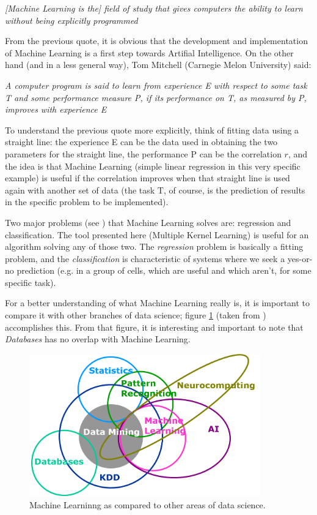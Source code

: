 \documentclass[paper=a4, fontsize=11pt]{scrartcl} %
\numberwithin{equation}{section} %
\numberwithin{figure}{section} %
\numberwithin{table}{section} %
\begin{document}
\begin{center}
\textit{[Machine Learning is the] field of study that gives computers the ability to learn without being explicitly programmed}
\end{center}

From the previous quote, it is obvious that the development and implementation of Machine Learning is a first step towards Artifial Intelligence. On the other hand (and in a less general way), Tom Mitchell (Carnegie Melon University) said:

\begin{center}
\textit{A computer program is said to learn from experience E with respect to some task T and some performance measure P, if its performance on T, as measured by P, improves with experience E}
\end{center}

To understand the previous quote more explicitly, think of fitting data using a straight line: the experience E can be the data used in obtaining the two parameters for the straight line, the performance P can be the correlation $r$, and the idea is that Machine Learning (simple linear regression in this very specific example) is useful if the correlation improves when that straight line is used again with another set of data (the task T, of course, is the prediction of results in the specific problem to be implemented).

Two major problems (see \cite{bishop1}) that Machine Learning solves are: regression and classification. The tool presented here (Multiple Kernel Learning) is useful for an algorithm solving any of those two. The \textit{regression} problem is basically a fitting problem, and the \textit{classification} is characteristic of systems where we seek a yes-or-no prediction (e.g. in a group of cells, which are useful and which aren't, for some specific task).

For a better understanding of what Machine Learning really is, it is important to compare it with other branches of data science; figure \ref{fig:ML_comparison_image} (taken from \cite{polly1}) accomplishes this. From that figure, it is interesting and important to note that \textit{Databases} has no overlap with Machine Learning.


\begin{figure}[t]
\includegraphics[width=10cm]{data-mining-Venn-diagram.png}
\centering
\caption{Machine Learninng as compared to other areas of data science.}
\label{fig:ML_comparison_image}
\end{figure}
\end{document}
